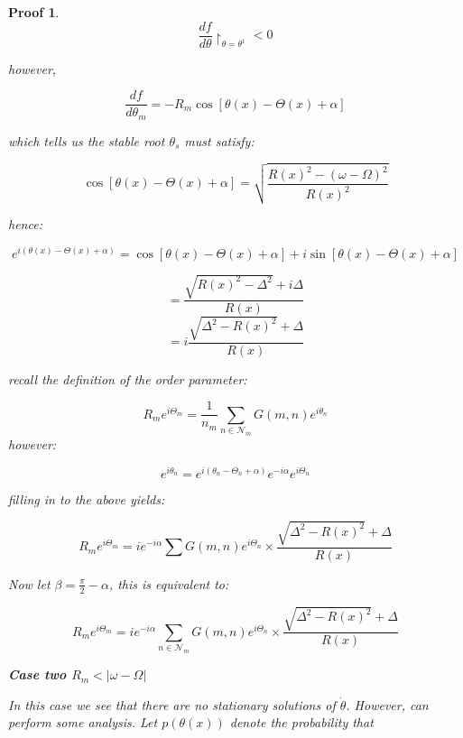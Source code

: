 \documentclass{article}
\newtheorem{pf}{Proof}[section]
\begin{document}
\begin{pf}
$$ \frac{df}{d\theta}\restriction_{\theta = \theta^1} < 0$$

however,

$$ \frac{df}{d\theta_m} = -R_m\cos[\theta(x) - \Theta(x) + \alpha] $$

which tells us the stable root $\theta_s$ must satisfy:

$$\cos[\theta(x) - \Theta(x) + \alpha] =  \sqrt{\frac{R(x)^2-(\omega-\Omega)^2}{R(x)^2}} $$

hence:

$$e^{i(\theta(x)-\Theta(x) +\alpha)} = \cos[\theta(x)-\Theta(x) +\alpha] + i\sin[\theta(x)-\Theta(x) +\alpha]$$

$$=\frac{\sqrt{R(x)^2-\Delta^2} + i\Delta}{R(x)} $$
$$=i \frac{\sqrt{\Delta^2-R(x)^2}+\Delta}{R(x)}$$

recall the definition of the order parameter: 

$$R_me^{i\Theta_m} = \frac{1}{n_m}\sum\limits_{n\in{\mathcal{N}_m}}^{} G(m,n) e^{i\theta_n}$$
however:

$$e^{i\theta_n} = e^{i(\theta_n - \Theta_n + \alpha)}e^{-i\alpha}e^{i\Theta_n}$$

filling in to the above yields:

$$R_m e^{i \Theta_m} = ie^{-i\alpha}\sum G(m,n)e^{i\Theta_n} \times \frac{\sqrt{\Delta^2-R(x)^2}+\Delta}{R(x)} $$

Now let $\beta = \frac{\pi}{2} - \alpha$, this is equivalent to:

$$R_m e^{i \Theta_m} = ie^{-i\alpha}\sum_{n \in \mathcal{N}_m} G(m,n)e^{i\Theta_n} \times \frac{\sqrt{\Delta^2-R(x)^2}+\Delta}{R(x)} $$

\textbf{Case two $R_m < |\omega - \Omega|$}



In this case we see that there are no stationary solutions of $\dot{\theta}$. However, can perform some analysis. Let $p(\theta(x))$ denote the probability that 


\end{pf}
\end{document}
